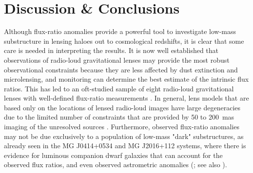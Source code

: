 \documentclass[a4paper,fleqn,usenatbib,useAMS]{mnras}
\begin{document}
\section{Discussion \& Conclusions}

Although flux-ratio anomalies provide a powerful tool to investigate low-mass substructure in lensing haloes out to cosmological redshifts, it is clear that some care is needed in interpreting the results. It is now well established that observations of radio-loud gravitational lenses may provide the most robust observational constraints because they are less affected by dust extinction and microlensing, and monitoring can determine the best estimate of the intrinsic flux ratios. This has led to an oft-studied sample of eight radio-loud gravitational lenses with well-defined flux-ratio measurements \citep{Dalal2002,KD04,Xu15}. In general, lens models that are based only on the locations of lensed radio-loud images have large degeneracies due to the limited number of constraints that are provided by 50 to 200~mas imaging of the unresolved sources \citep[e.g.][]{Ka91}. Furthermore, observed flux-ratio anomalies may not be due exclusively to a population of low-mass "dark" substructures, as already seen in the MG J0414+0534 and MG J2016+112 systems, where there is evidence for luminous companion dwarf galaxies that can account for the observed flux ratios, and even observed astrometric anomalies (\citealt{ros00,chen07,more09}; see also \citealt{mckean07,jackson10}). 
\end{document}

